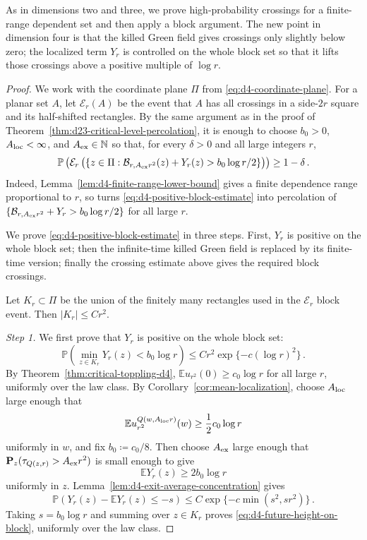 \documentclass[11pt]{amsart}
\theoremstyle{plain}
\theoremstyle{definition}
\newcommand{\N}{\mathbb{N}}
\newcommand{\E}{\mathbb{E}}
\renewcommand{\P}{\mathbb{P}}
\begin{document}
As in dimensions two and three, we prove high-probability crossings for a
finite-range dependent set and then apply a block argument. The
new point in dimension four is that the killed Green field gives crossings only
slightly below zero; the localized term $Y_r$ is controlled on the whole
block set so that it lifts those crossings above a positive multiple of
$\log r$.

\begin{proof}
We work with the coordinate plane $\Pi$ from \eqref{eq:d4-coordinate-plane}. 
For a planar set $A$, let $\mathcal E_r(A)$ be the event that
$A$ has all crossings in a side-$2r$ square and its half-shifted rectangles.
By the same argument as in the proof of Theorem~\ref{thm:d23-critical-level-percolation}, 
it is enough to choose $b_0>0$, $A_{\rm loc}<\infty$, and
$A_{\rm ex}\in\N$ so that, for every $\delta>0$ and all large integers $r$,
\begin{equation}\label{eq:d4-positive-block-estimate}
    \P\left(
    \mathcal E_r\left(
    \{z\in\Pi:\mathcal B_{r,A_{\rm ex}r^2}(z)+Y_r(z)>b_0\log r/2\}
    \right)
    \right)\geq1-\delta\, .
\end{equation}
Indeed, Lemma~\ref{lem:d4-finite-range-lower-bound} gives a finite dependence
range proportional to $r$, so \citet[Corollary~1.4]{LSS} turns
\eqref{eq:d4-positive-block-estimate} into percolation of
$\{\mathcal B_{r,A_{\rm ex}r^2}+Y_r>b_0\log r/2\}$ for all large $r$.

We prove \eqref{eq:d4-positive-block-estimate} in three steps. First, $Y_r$ is
positive on the whole block set; then the infinite-time killed Green field is
replaced by its finite-time version; finally the crossing estimate above gives
the required block crossings.

Let $K_r\subset\Pi$ be the union of the finitely many rectangles used in the
$\mathcal E_r$ block event. Then $|K_r|\leq Cr^2$.

\smallskip
\noindent\emph{Step 1.} We first prove that $Y_r$ is positive on the whole block set:
\begin{equation}\label{eq:d4-future-height-on-block}
    \P\left(\min_{z\in K_r}Y_r(z)<b_0\log r\right)
    \leq Cr^2\exp\{-c(\log r)^2\}\, .
\end{equation}
By Theorem~\ref{thm:critical-toppling-d4}, $\E u_{r^2}(0)\geq c_0\log r$ for
all large $r$, uniformly over the law class. By
Corollary~\ref{cor:mean-localization}, choose $A_{\rm loc}$ large enough that
\[
    \E u_{r^2}^{Q(w,A_{\rm loc}r)}(w)\geq \frac12 c_0\log r
\]
uniformly in $w$, and fix $b_0\coloneqq c_0/8$. Then choose $A_{\rm ex}$ large enough that
$\mathbf P_z(\tau_{Q(z,r)}>A_{\rm ex}r^2)$ is small enough to give
\[
    \E Y_r(z)\geq 2b_0\log r
\]
uniformly in $z$. Lemma~\ref{lem:d4-exit-average-concentration} gives
\[
    \P(Y_r(z)-\E Y_r(z)\leq-s)
    \leq
    C\exp\{-c\min(s^2,sr^2)\}\, .
\]
Taking $s=b_0\log r$ and summing over $z\in K_r$ proves
\eqref{eq:d4-future-height-on-block}, uniformly over the law class.


\end{proof}
\end{document}

